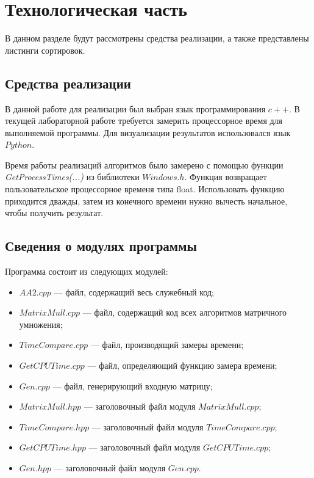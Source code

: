 \chapter{Технологическая часть}
В данном разделе будут рассмотрены средства реализации, а также представлены листинги сортировок.
\section{Средства реализации}
В данной работе для реализации был выбран язык программирования $c++$. В текущей лабораторной работе требуется замерить процессорное время для выполняемой программы. Для визуализации результатов использовался язык $Python$.

Время работы реализаций алгоритмов было замерено с помощью функции \textit{GetProcessTimes(...)} \cite{time} из библиотеки $Windows.h$. Функция возвращает пользовательское процессорное временя типа float.
Использовать функцию приходится дважды, затем из конечного времени нужно вычесть начальное, чтобы получить результат.


\section{Сведения о модулях программы}
Программа состоит из следующих модулей:
\begin{itemize}
	\item $AA2.cpp$ --- файл, содержащий весь служебный код;
	\item $MatrixMull.cpp$ --- файл, содержащий код всех алгоритмов матричного умножения;
	\item $TimeCompare.cpp$ --- файл, производящий замеры времени;
	\item $GetCPUTime.cpp$ --- файл, определяющий функцию замера времени;
	\item $Gen.cpp$ --- файл, генерирующий входную матрицу;
	\newpage
	\item $MatrixMull.hpp$ --- заголовочный файл модуля $MatrixMull.cpp$;
	\item $TimeCompare.hpp$ --- заголовочный файл модуля $TimeCompare.cpp$;
	\item $GetCPUTime.hpp$ --- заголовочный файл модуля $GetCPUTime.cpp$;
	\item $Gen.hpp$ --- заголовочный файл модуля $Gen.cpp$.\newline
\end{itemize}

